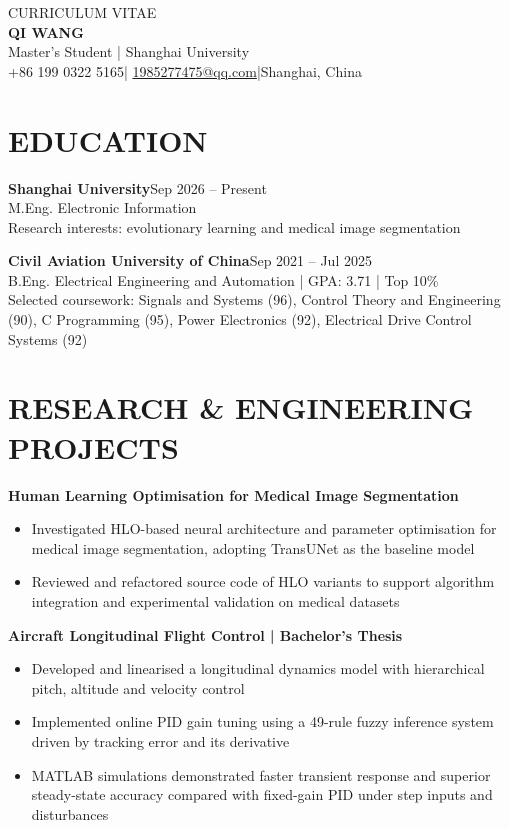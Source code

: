 \documentclass[10pt,a4paper]{article}
\begin{document}
\begin{center}
  {\small CURRICULUM VITAE}\\[4pt]
  {\LARGE\bfseries QI WANG}\\[4pt]
  Master's Student | Shanghai University\\[3pt]
  +86 199 0322 5165\quad |\quad
  \href{mailto:1985277475@qq.com}{1985277475@qq.com}\quad |\quad Shanghai, China
\end{center}

\section*{EDUCATION}
\textbf{Shanghai University}\hfill Sep 2026 -- Present\\
M.Eng. Electronic Information\\
Research interests: evolutionary learning and medical image segmentation

\textbf{Civil Aviation University of China}\hfill Sep 2021 -- Jul 2025\\
B.Eng. Electrical Engineering and Automation | GPA: 3.71 | Top 10\%\\
Selected coursework: Signals and Systems (96), Control Theory and Engineering (90),
C Programming (95), Power Electronics (92), Electrical Drive Control Systems (92)

\section*{RESEARCH \& ENGINEERING PROJECTS}
\textbf{Human Learning Optimisation for Medical Image Segmentation}
\begin{itemize}
  \item Investigated HLO-based neural architecture and parameter optimisation for medical image segmentation, adopting TransUNet as the baseline model
  \item Reviewed and refactored source code of HLO variants to support algorithm integration and experimental validation on medical datasets
\end{itemize}

\textbf{Aircraft Longitudinal Flight Control | Bachelor's Thesis}
\begin{itemize}
  \item Developed and linearised a longitudinal dynamics model with hierarchical pitch, altitude and velocity control
  \item Implemented online PID gain tuning using a 49-rule fuzzy inference system driven by tracking error and its derivative
  \item MATLAB simulations demonstrated faster transient response and superior steady-state accuracy compared with fixed-gain PID under step inputs and disturbances
\end{itemize}
\end{document}
